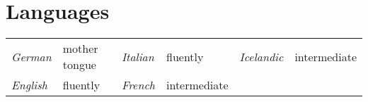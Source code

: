 \documentclass[a4paper]{simplecv}
\begin{document}
\section{Languages}
\label{languages}
\begin{tabular}{llllll}%
{\sf \emph{German}}    & mother tongue \qquad\qquad &
{\sf \emph{Italian}}   & fluently \qquad\qquad\qquad &
{\sf \emph{Icelandic}} & intermediate \\
{\sf \emph{English}}   & fluently &
{\sf \emph{French}}    & intermediate &
\end{tabular}
%
\iffalse
\begin{topic}
\item[German] mother tongue
\vspace*{-1ex}
\item[English] fluently
\vspace*{-1ex}
\item[Italian] fluently
\vspace*{-1ex}
\item[French] intermediate
\vspace*{-1ex}
\item[Icelandic] basic
\end{topic}
\fi






\renewcommand\refname{List of publications}
\label{publications}

%
\end{document}
